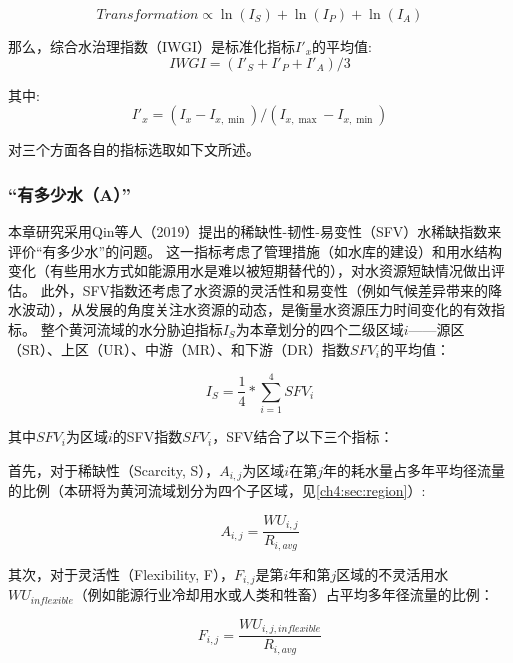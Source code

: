 \begin{equation}
    Transformation \propto \ln(I_S) + \ln(I_P) + \ln(I_A)
\end{equation}

那么，综合水治理指数（IWGI）是标准化指标$I'_x$的平均值:
\begin{equation}
    IWGI = (I'_S + I'_P + I'_A) / 3
\end{equation}

其中:
\begin{equation}
    I'_x = (I_x - I_{x, \min}) / (I_{x, \max} - I_{x, \min})
\end{equation}

对三个方面各自的指标选取如下文所述。

\subsubsection*{“有多少水（A）”}

本章研究采用Qin等人（2019）提出的稀缺性-韧性-易变性（SFV）水稀缺指数来评价“有多少水”的问题\cite{qin2019}。
这一指标考虑了管理措施（如水库的建设）和用水结构变化（有些用水方式如能源用水是难以被短期替代的），对水资源短缺情况做出评估。
此外，SFV指数还考虑了水资源的灵活性和易变性（例如气候差异带来的降水波动），从发展的角度关注水资源的动态，是衡量水资源压力\cite{qin2019}时间变化的有效指标。
整个黄河流域的水分胁迫指标$I_S$为本章划分的四个二级区域$i$——源区（SR）、上区（UR）、中游（MR）、和下游（DR）指数$SFV_{i}$的平均值：

\begin{equation}
    I_S = \frac{1}{4} * \sum_{i=1}^4 SFV_{i}
\end{equation}

其中$SFV_i$为区域$i$的SFV指数$SFV_i$，SFV结合了以下三个指标：

首先，对于稀缺性（Scarcity, S），$A_{i, j}$为区域$i$在第$j$年的耗水量占多年平均径流量的比例（本研将为黄河流域划分为四个子区域，见\ref{ch4:sec:region}）:

\begin{equation}
    A_{i, j} = \frac{WU_{i,j}}{R_{i, avg}}
\end{equation}

其次，对于灵活性（Flexibility, F），$F_{i, j}$是第$i$年和第$j$区域的不灵活用水$WU_{inflexible}$（例如能源行业冷却用水或人类和牲畜）占平均多年径流量的比例：

\begin{equation}
    F_{i, j} = \frac{WU_{i, j, inflexible}}{R_{i, avg}}
\end{equation}

